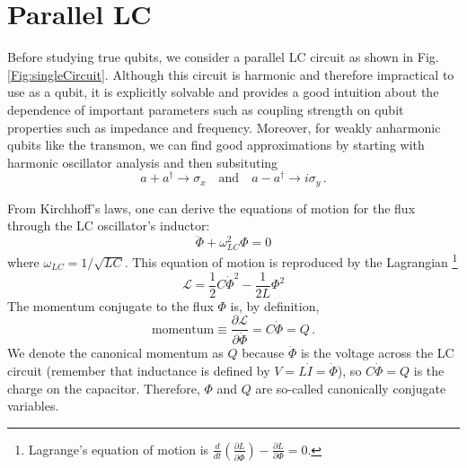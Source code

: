 \section{Parallel LC}

Before studying true qubits, we consider a parallel LC circuit as shown in Fig.\,\ref{Fig:singleCircuit}.
Although this circuit is harmonic and therefore impractical to use as a qubit, it is explicitly solvable and provides a good intuition about the dependence of important parameters such as coupling strength on qubit properties such as impedance and frequency.
Moreover, for weakly anharmonic qubits like the transmon, we can find good approximations by starting with harmonic oscillator analysis and then subsituting
\begin{equation}
a+a^\dagger \rightarrow \sigma_x \quad \textrm{and} \quad a-a^\dagger \rightarrow i \sigma_y \, .
\end{equation}

From Kirchhoff's laws, one can derive the equations of motion for the flux through the LC oscillator's inductor:
\begin{equation}
\ddot{\Phi} + \omega_{LC}^2 \Phi = 0 \end{equation}
where $\omega_{LC}=1/\sqrt{LC}$.
This equation of motion is reproduced by the Lagrangian \footnote{Lagrange's equation of motion is $\frac{d}{dt}\left( \frac{\partial L}{\partial \dot{\Phi}} \right) - \frac{\partial L}{\partial \Phi} = 0$.}
\begin{equation}
\mathcal{L} = \frac{1}{2}C\dot{\Phi}^2 - \frac{1}{2L}\Phi^2
\end{equation}
The momentum conjugate to the flux $\Phi$ is, by definition,
\begin{equation}
  \text{momentum} \equiv \frac{\partial \mathcal{L}}{\partial \dot{\Phi}} = C\dot{\Phi} = Q \, .
\end{equation}
We denote the canonical momentum as $Q$ because $\dot{\Phi}$ is the voltage across the LC circuit (remember that inductance is defined by $V = L \dot{I} = \dot{\Phi}$), so $C \dot{\Phi} = Q$ is the charge on the capacitor.
Therefore, $\Phi$ and $Q$ are so-called canonically conjugate variables.


